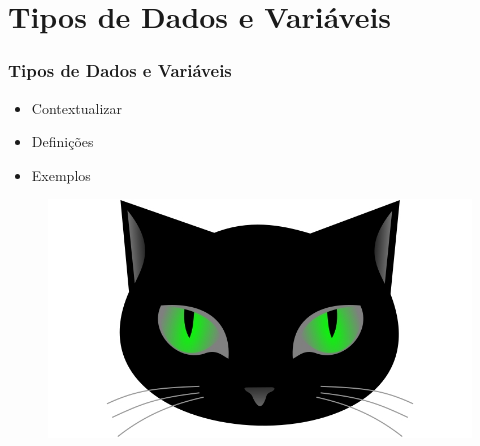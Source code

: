 
\section{Tipos de Dados e Variáveis}

\begin{frame}
\frametitle{Tipos de Dados e Variáveis}
\begin{minipage}{0.47\textwidth}
    \begin{itemize}
        \item Contextualizar
        \item Definições
        \item Exemplos
    \end{itemize}
\end{minipage}
\begin{minipage}{0.5\textwidth}
\begin{figure}[ht!]
\begin{center}
\includegraphics[width=1.2\textwidth, height=0.40\textheight]{figures/logo_picat_alex.jpg}
\end{center}
\end{figure}
\end{minipage}
\end{frame}



